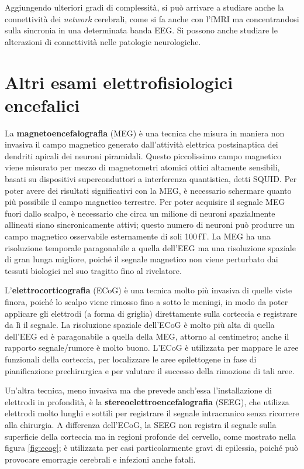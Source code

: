 \documentclass{report}
\newcommand{\figref}[1]{figura \ref{#1}}
\numberwithin{equation}{section}
\numberwithin{figure}{section}
\begin{document}
\noindent Aggiungendo ulteriori gradi di complessità, si può arrivare a studiare anche la connettività dei \textit{network} cerebrali, come si fa anche con l'fMRI ma concentrandosi sulla sincronia in una determinata banda EEG. Si possono anche studiare le alterazioni di connettività nelle patologie neurologiche.

\section{Altri esami elettrofisiologici encefalici}
La \textbf{magnetoencefalografia} (MEG) è una tecnica che misura in maniera non invasiva il campo magnetico generato dall'attività elettrica postsinaptica dei dendriti apicali dei neuroni piramidali. Questo piccolissimo campo magnetico viene misurato per mezzo di magnetometri atomici ottici altamente sensibili, basati su dispositivi superconduttori a interferenza quantistica, detti SQUID. Per poter avere dei risultati significativi con la MEG, è necessario schermare quanto più possibile il campo magnetico terrestre. Per poter acquisire il segnale MEG fuori dallo scalpo, è necessario che circa un milione di neuroni spazialmente allineati siano sincronicamente attivi; questo numero di neuroni può produrre un campo magnetico osservabile esternamente di soli 100\,fT. La MEG ha una risoluzione temporale paragonabile a quella dell'EEG ma una risoluzione spaziale di gran lunga migliore, poiché il segnale magnetico non viene perturbato dai tessuti biologici nel suo tragitto fino al rivelatore.

L'\textbf{elettrocorticografia} (ECoG) è una tecnica molto più invasiva di quelle viste finora, poiché lo scalpo viene rimosso fino a sotto le meningi, in modo da poter applicare gli elettrodi (a forma di griglia) direttamente sulla corteccia e registrare da lì il segnale. La risoluzione spaziale dell'ECoG è molto più alta di quella dell'EEG ed è paragonabile a quella della MEG, attorno al centimetro; anche il rapporto segnale/rumore è molto buono. L'ECoG è utilizzata per mappare le aree funzionali della corteccia, per localizzare le aree epilettogene in fase di pianificazione prechirurgica e per valutare il successo della rimozione di tali aree.

Un'altra tecnica, meno invasiva ma che prevede anch'essa l'installazione di elettrodi in profondità, è la \textbf{stereoelettroencefalografia} (SEEG), che utilizza elettrodi molto lunghi e sottili per registrare il segnale intracranico senza ricorrere alla chirurgia. A differenza dell'ECoG, la SEEG non registra il segnale sulla superficie della corteccia ma in regioni profonde del cervello, come mostrato nella \figref{fig:ecog}; è utilizzata per casi particolarmente gravi di epilessia, poiché può provocare emorragie cerebrali e infezioni anche fatali.
\end{document}
